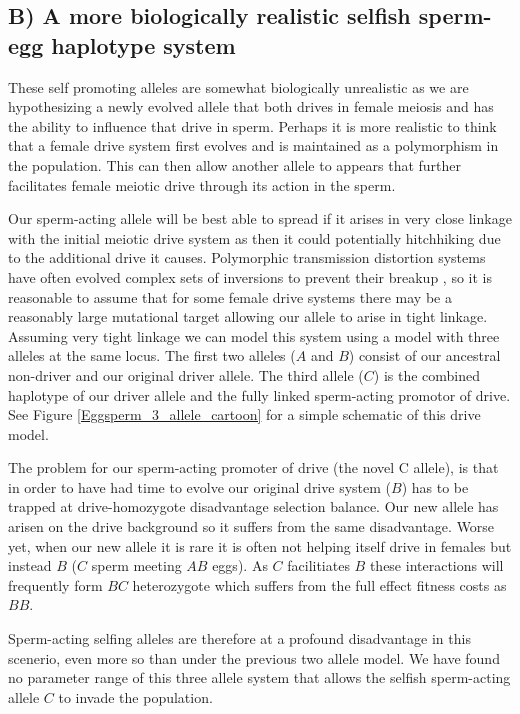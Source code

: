 \documentclass[12pt,letterpaper]{article}
\begin{document}
\subsection*{B) A more biologically realistic selfish sperm-egg haplotype system}
These self promoting alleles are somewhat biologically unrealistic as
we are hypothesizing a newly evolved allele  
that both drives in female meiosis and has the ability to influence that drive in sperm.
Perhaps it is more realistic to think that a female drive system first
evolves and is maintained as a polymorphism in the population. 
This can then allow another allele to appears that further facilitates
female meiotic drive through its action in the sperm. 

Our sperm-acting allele will be best able to spread if it arises in very close
linkage with the initial meiotic drive system as then it could potentially
hitchhiking due to the additional drive it causes. Polymorphic transmission distortion systems
have often evolved complex sets of inversions to prevent their breakup
\citep{XXX}, so it is reasonable to assume that for some female drive
systems there may be a reasonably large mutational target allowing our
allele to arise in tight linkage. Assuming very tight linkage we can
model this system using a model with three alleles at the same
locus. The first two alleles ($A$ and $B$) consist of our ancestral non-driver and
our original driver allele. The third allele ($C$) is the 
combined haplotype of our driver allele and the fully linked
sperm-acting promotor of drive.
 See Figure
\ref{Eggsperm_3_allele_cartoon} for a simple schematic of this drive model.  

The problem for our sperm-acting promoter of drive (the novel C
allele), is that in order to have had time to evolve our original
drive system ($B$) has to be trapped at drive-homozygote disadvantage selection balance. 
Our new allele has arisen on the drive background so it
suffers from the same disadvantage. 
Worse yet, when our new allele it is rare it is often not helping
itself drive in females but instead $B$ ($C$ sperm meeting $AB$ eggs).
As $C$ facilitiates $B$ these interactions will frequently form 
$BC$ heterozygote which suffers from the full
effect fitness costs as $BB$. 

Sperm-acting selfing alleles are therefore at a profound disadvantage
in this scenerio, even more so than under the previous two allele model.
We have found no parameter range of this
three allele system that allows the selfish sperm-acting allele $C$ to
invade the population. 
\end{document}
